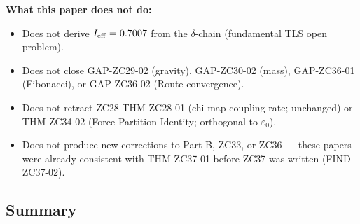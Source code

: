 \documentclass[12pt, a4paper]{article}
\begin{document}
\begin{formalbox}[title={Reconstruction Test (CUIP No-Loss)}]
\medskip
\textbf{What this paper does not do:}
\begin{itemize}[leftmargin=*, noitemsep]
  \item Does not derive $I_{\rm eff} = 0.7007$ from the
    $\delta$-chain (fundamental TLS open problem).
  \item Does not close GAP-ZC29-02 (gravity), GAP-ZC30-02
    (mass), GAP-ZC36-01 (Fibonacci), or GAP-ZC36-02
    (Route convergence).
  \item Does not retract ZC28 THM-ZC28-01 (chi-map coupling
    rate; unchanged) or THM-ZC34-02 (Force Partition
    Identity; orthogonal to $\varepsilon_0$).
  \item Does not produce new corrections to Part B, ZC33,
    or ZC36 --- these papers were already consistent with
    THM-ZC37-01 before ZC37 was written (FIND-ZC37-02).
\end{itemize}
\end{formalbox}

\subsection{Summary}
\label{sec:summary}
\end{document}
